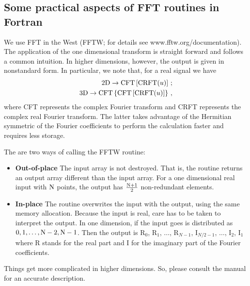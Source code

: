 \documentclass[11pt]{article}
\begin{document}
\subsection*{Some practical aspects of FFT routines in Fortran}
We use FFT in the West (FFTW; for details see {www.fftw.org/documentation}). The application of the one dimensional transform is straight forward and follows a common intuition. In higher dimensions, however, the output is given in nonstandard form. In particular, we note that, for a real signal we have
\begin{align}
    \text{2D} \rightarrow \text{CFT}\left[\text{CRFT}(u)\right]\,; \nonumber \\
    \text{3D} \rightarrow \text{CFT}\left\{\text{CFT}\left[\text{CRFT}(u)\right]\right\}\, , 
\end{align}
where CFT represents the complex Fourier transform and CRFT represents the complex real Fourier transform. The latter
 takes advantage of the Hermitian symmetric of the Fourier coefficients to perform the calculation faster and requires
  less storage.

    The are two ways of calling the FFTW routine:
    \begin{itemize}
        \item {\bf Out-of-place}
            \subitem The input array is not destroyed. That is, the routine returns an output array
                        different than the input array. For a one dimensional real input with $\mathrm{N}$ points, the
                        output has $\tfrac{\mathrm{N}+1}{2}$ non-redundant elements.
        \item {\bf In-place}
            \subitem The routine overwrites the input with the output, using the same memory allocation.
                Because the input is real, care has to be taken to interpret the output. In one dimension,
                 if the input goes is distributed as  $0, 1, \ldots, \mathrm{N}-2, \mathrm{N}-1$. Then the output is 
                 R$_0$, R$_1$, $\ldots$, R$_{N-1}$, I$_{N/2-1}$, $\ldots$, I$_2$, I$_1$\com where R stands
                  for the real part and I for the imaginary part of the Fourier coefficients.
    \end{itemize}

    Things get more complicated in higher dimensions. So, please consult the manual for an accurate description.
\end{document}
